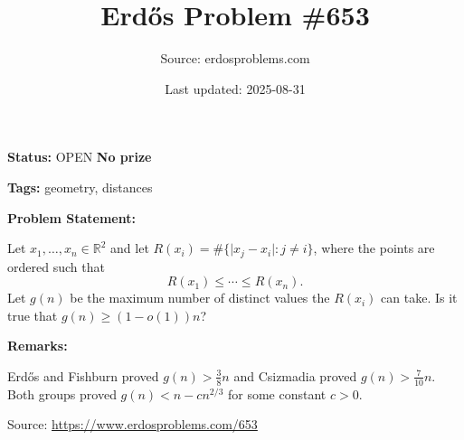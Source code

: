 \documentclass{article}
\title{Erd\H{o}s Problem \#653}
\date{Last updated: 2025-08-31}
\author{Source: erdosproblems.com}
\begin{document}
\maketitle

\noindent\textbf{Status:} OPEN \quad \textbf{No prize}

\noindent\textbf{Tags:} geometry, distances

\medskip
\noindent\textbf{Problem Statement:}

Let $x_1,\ldots,x_n\in \mathbb{R}^2$ and let $R(x_i)=\#\{ \lvert x_j-x_i\rvert : j\neq i\}$, where the points are ordered such that\[R(x_1)\leq \cdots \leq R(x_n).\]Let $g(n)$ be the maximum number of distinct values the $R(x_i)$ can take. Is it true that $g(n) \geq (1-o(1))n$?

\bigskip
\noindent\textbf{Remarks:}

Erd\H{o}s and Fishburn proved $g(n)>\frac{3}{8}n$ and Csizmadia proved $g(n)>\frac{7}{10}n$. Both groups proved $g(n) < n-cn^{2/3}$ for some constant $c>0$.

\bigskip
\noindent\small{Source: \url{https://www.erdosproblems.com/653}}
\end{document}
